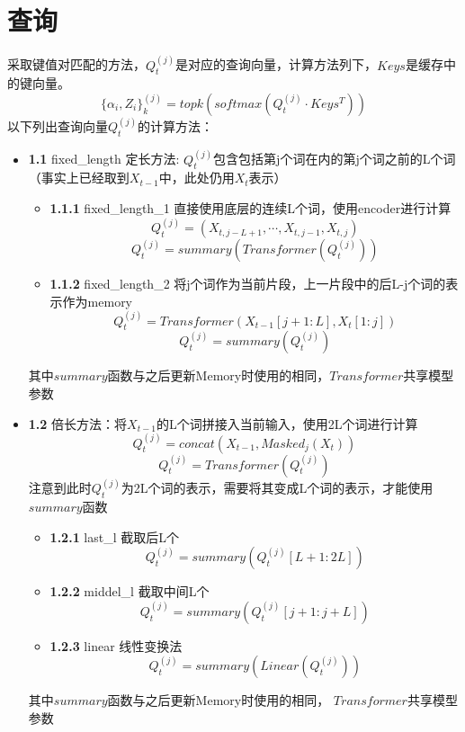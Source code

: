 \documentclass{article}
\begin{document}
\section{查询}
		采取键值对匹配的方法，$Q_t^{(j)}$是对应的查询向量，计算方法列下，$Keys$是缓存中的键向量。
		$$\{\alpha_i, Z_i\}_k^{(j)} = topk(softmax(Q_t^{(j)} \cdot Keys^T))$$
		以下列出查询向量$Q_t^{(j)}$的计算方法：
		\begin{itemize}
			\item \textbf{1.1} fixed\_length 定长方法: $Q_t^{(j)}$包含包括第j个词在内的第j个词之前的L个词（事实上已经取到$X_{t-1}$中，此处仍用$X_t$表示）
			\begin{itemize}
				\item \textbf{1.1.1} fixed\_length\_1 直接使用底层的连续L个词，使用encoder进行计算
					$$Q_t^{(j)} = (X_{t,j-L+1}, \cdots, X_{t,j-1}, X_{t,j})$$ 
					$$Q_t^{(j)} = summary(Transformer(Q_t^{(j)}))$$
				\item \textbf{1.1.2} fixed\_length\_2 将j个词作为当前片段，上一片段中的后L-j个词的表示作为memory
				$$Q_t^{(j)} = Transformer(X_{t-1}[j+1:L], X_t[1:j])$$ 
					$$Q_t^{(j)} = summary(Q_t^{(j)})$$
			\end{itemize}
			
			 其中$summary$函数与之后更新Memory时使用的相同，$Transformer$共享模型参数

		\item \textbf{1.2} 倍长方法：将$X_{t-1}$的L个词拼接入当前输入，使用2L个词进行计算
		$$Q_t^{(j)} = concat(X_{t-1}, Masked_j(X_t))$$
		$$Q_t^{(j)} = Transformer(Q_t^{(j)})$$
		注意到此时$Q_t^{(j)}$为2L个词的表示，需要将其变成L个词的表示，才能使用$summary$函数
		\begin{itemize}
			\item \textbf{1.2.1} last\_l 截取后L个
				$$Q_t^{(j)} = summary(Q_t^{(j)}[L+1:2L])$$
			\item \textbf{1.2.2} middel\_l 截取中间L个
				$$Q_t^{(j)} = summary(Q_t^{(j)}[j+1:j+L])$$
			\item \textbf{1.2.3} linear 线性变换法
				$$Q_t^{(j)} = summary(Linear(Q_t^{(j)}))$$
		\end{itemize}
			
			其中$summary$函数与之后更新Memory时使用的相同， $Transformer$共享模型参数
	\end{itemize}
\end{document}

